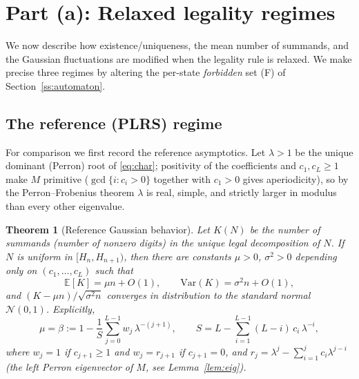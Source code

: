 \documentclass[12pt]{article}
\newtheorem{theorem}{Theorem}
\theoremstyle{definition}
\newcommand{\E}{\mathbb{E}}
\begin{document}
\section{Part (a): Relaxed legality regimes}\label{sec:a}

We now describe how existence/uniqueness, the mean number of summands, and the
Gaussian fluctuations are modified when the legality rule is relaxed. We make
precise three regimes by altering the per-state \emph{forbidden} set (F) of
Section~\ref{ss:automaton}.

\subsection{The reference (PLRS) regime}
For comparison we first record the reference asymptotics. Let $\lambda>1$ be the
unique dominant (Perron) root of \eqref{eq:char}; positivity of the coefficients
and $c_1,c_L\ge1$ make $M$ primitive
($\gcd\{i: c_i>0\}$ together with $c_1>0$ gives aperiodicity), so by the
Perron--Frobenius theorem $\lambda$ is real, simple, and strictly larger in
modulus than every other eigenvalue.

\begin{theorem}[Reference Gaussian behavior]\label{thm:gauss}
Let $K(N)$ be the number of summands (number of nonzero digits) in the unique
legal decomposition of $N$. If $N$ is uniform in $[H_n,H_{n+1})$, then there are
constants $\mu>0$, $\sigma^2>0$ depending only on $(c_1,\dots,c_L)$ such that
\begin{equation}\label{eq:mean}
\E[K]=\mu n+O(1),\qquad \mathrm{Var}(K)=\sigma^2 n+O(1),
\end{equation}
and $(K-\mu n)/\sqrt{\sigma^2 n}$ converges in distribution to the standard
normal $\mathcal N(0,1)$. Explicitly,
\begin{equation}\label{eq:density}
\mu=\beta:=1-\frac1S\sum_{j=0}^{L-1} w_j\,\lambda^{-(j+1)},\qquad
S=L-\sum_{i=1}^{L-1}(L-i)\,c_i\,\lambda^{-i},
\end{equation}
where $w_j=1$ if $c_{j+1}\ge1$ and $w_j=r_{j+1}$ if $c_{j+1}=0$, and
$r_j=\lambda^{j}-\sum_{i=1}^{j}c_i\lambda^{j-i}$ (the left Perron eigenvector of
$M$, see Lemma~\ref{lem:eig}).
\end{theorem}
\end{document}
